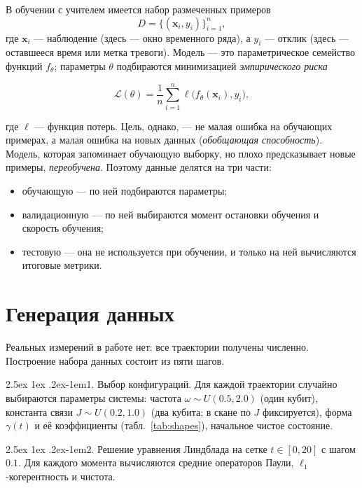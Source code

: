 \documentclass[12pt,a4paper]{report}
\makeatletter
\renewcommand\paragraph{\@startsection{paragraph}{4}{\z@}%
  {2.5ex \@plus1ex \@minus.2ex}{-1em}{\normalfont\normalsize\bfseries}}
\numberwithin{equation}{chapter}
\makeatother
\begin{document}
В обучении с учителем имеется набор размеченных примеров
\[
D=\{(\mathbf x_i,y_i)\}_{i=1}^n,
\]
где $\mathbf x_i$ --- наблюдение (здесь --- окно временного ряда), а $y_i$ ---
отклик (здесь --- оставшееся время или метка тревоги). Модель --- это
параметрическое семейство функций $f_\theta$; параметры $\theta$ подбираются
минимизацией \emph{эмпирического риска}
\begin{keybox}
\begin{equation}
\mathcal L(\theta)=\frac1n\sum_{i=1}^n\ell\bigl(f_\theta(\mathbf x_i),y_i\bigr),
\end{equation}
\end{keybox}
где $\ell$ --- функция потерь. Цель, однако, --- не малая ошибка на обучающих
примерах, а малая ошибка на новых данных (\emph{обобщающая способность}).
Модель, которая запоминает обучающую выборку, но плохо предсказывает новые
примеры, \emph{переобучена}. Поэтому данные делятся на три части:
\begin{itemize}
\item обучающую --- по ней подбираются параметры;
\item валидационную --- по ней выбираются момент остановки обучения и
      скорость обучения;
\item тестовую --- она не используется при обучении, и только на ней
      вычисляются итоговые метрики.
\end{itemize}

\section{Генерация данных}

Реальных измерений в работе нет: все траектории получены численно.
Построение набора данных состоит из пяти шагов.

\paragraph{1. Выбор конфигураций.} Для каждой траектории случайно выбираются
параметры системы: частота $\omega\sim U(0.5,2.0)$ (один кубит), константа
связи $J\sim U(0.2,1.0)$ (два кубита; в скане по $J$ фиксируется), форма
$\gamma(t)$ и её коэффициенты (табл.~\ref{tab:shapes}), начальное чистое
состояние.

\paragraph{2. Решение уравнения Линдблада} на сетке $t\in[0,20]$ с шагом
$0.1$. Для каждого момента вычисляются средние операторов Паули,
$\ell_1$-когерентность и чистота.
\end{document}
